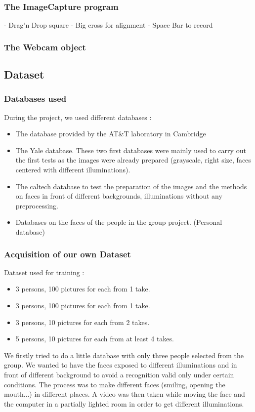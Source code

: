 \subsubsection{The ImageCapture program}
- Drag'n Drop square
- Big cross for alignment
- Space Bar to record

\subsubsection{The Webcam object}

\subsection{Dataset}
\subsubsection{Databases used}
During the project, we used different databases :
\begin{itemize}
 \item The database provided by the AT\&T laboratory in Cambridge
\item The Yale database. These two first databases were mainly used to carry out the first tests as the images were already prepared (grayscale, right size, faces centered with different illuminations).
\item The caltech database to test the preparation of the images and the methods on faces in front of different backgrounds, illuminations without any preprocessing.
\item Databases on the faces of the people in the group project. (Personal database)
\end{itemize}
\subsubsection{Acquisition of our own Dataset}
Dataset used for training :
\begin{itemize}
 \item 3 persons, 100 pictures for each from 1 take.  
\item 3 persons, 100 pictures for each from 1 take.
\item 3 persons, 10 pictures for each from 2 takes.
\item 5 persons, 10 pictures for each from at least 4 takes.
\end{itemize}
We firstly tried to do a little database with only three people selected from the group. We wanted to have the faces exposed to different illuminations and in front of different background to avoid a recognition valid only under certain conditions. The process was to make different faces (smiling, opening the mouth...) in different places. A video was then taken while moving the face and the computer in a partially lighted room in order to get different illuminations. 

